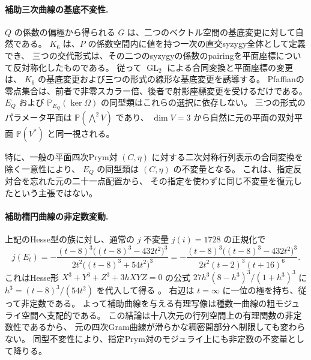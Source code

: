 \paragraph{補助三次曲線の基底不変性.}
$Q$ の係数の偏極から得られる $G$ は、二つのベクトル空間の基底変更に対して自然である。
$K_6$ は、$P$ の係数空間内に値を持つ一次の直交syzygy全体として定義でき、
三つの交代形式は、その二つのsyzygyの係数のpairingを平面座標について反対称化したものである。
従って $\operatorname{GL}_2$ による合同変換と平面座標の変更は、
$K_6$ の基底変更および三つの形式の線形な基底変更を誘導する。
Pfaffianの零点集合は、前者で非零スカラー倍、後者で射影座標変更を受けるだけである。
$E_Q$ および $\mathbb P_{E_Q}(\ker\Omega)$ の同型類はこれらの選択に依存しない。
三つの形式のパラメータ平面は $\mathbb P(\bigwedge^2V)$ であり、
$\dim V=3$ から自然に元の平面の双対平面 $\mathbb P(V^*)$ と同一視される。

特に、一般の平面四次Prym対 $(C,\eta)$ に対する二次対称行列表示の合同変換を除く一意性により、
$E_Q$ の同型類は $(C,\eta)$ の不変量となる。
これは、指定反対合を忘れた元の二十一点配置から、
その指定を使わずに同じ不変量を復元したという主張ではない。

\paragraph{補助楕円曲線の非定数変動.}
上記のHesse型の族に対し、通常の $j$ 不変量 $j(i)=1728$ の正規化で
\[
 j(E_t)=-\frac{(t-8)^3\bigl((t-8)^3-432t^2\bigr)^3}
 {2t^2\bigl((t-8)^3+54t^2\bigr)^3}
 =-\frac{(t-8)^3\bigl((t-8)^3-432t^2\bigr)^3}
 {2t^2(t-2)^3(t+16)^6}.
\]
これはHesse形 $X^3+Y^3+Z^3+3hXYZ=0$ の公式
$27h^3(8-h^3)^3/(1+h^3)^3$ に
$h^3=(t-8)^3/(54t^2)$ を代入して得る
\cite[\S2]{ArtebaniDolgachevHesse}。
右辺は $t=\infty$ に一位の極を持ち、従って非定数である。
よって補助曲線を与える有理写像は種数一曲線の粗モジュライ空間へ支配的である。
この結論は十八次元の行列空間上の有理関数の非定数性であるから、
元の四次Gram曲線が滑らかな稠密開部分へ制限しても変わらない。
同型不変性により、指定Prym対のモジュライ上にも非定数の不変量として降りる。
